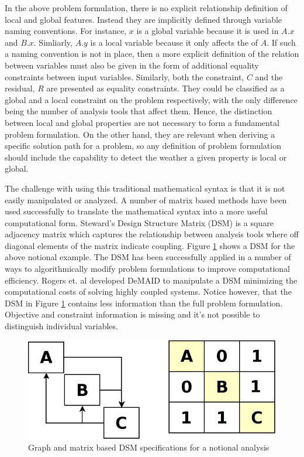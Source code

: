     In the above problem formulation, there is no explicit relationship definition of local and global features. Instead they are 
    implicitly defined through variable naming conventions. For instance, $x$ is a global variable because it is used in $A.x$ and $B.x$. 
    Simliarly, $A.y$ is a local variable because it only affects the of $A$. If such a naming convention is not in place, 
    then a more explicit definition of the relation between variables must also be given in the form of additional equality constraints between 
    input variables. Similarly, both the constraint, $C$ and the residual, $R$ are presented as equality constraints. They could be classified as 
    a global and a local constraint on the problem respectively, with the only difference being the number of analysis tools that affect them.  
    Hence, the distinction between local and global properties are not necessary to form a fundamental 
    problem formulation. On the other hand, they are relevant when deriving a specific solution path for a problem, so any definition of problem 
    formulation should include the capability to detect the weather a given property is local or global. 

    The challenge with using this traditional mathematical syntax is that it is not easily manipulated or analyzed. 
    A number of matrix based methods have been used successfully to translate the mathematical syntax into a more useful computational form. 
    Steward's Design Structure Matrix (DSM) is a square adjacency matrix which captures the relationship between analysis tools where off 
    diagonal elements of the matrix indicate coupling\cite{Steward1981}. Figure \ref{fig:dsm_simple} shows a DSM for the above notional example. 
    The DSM has been successfully applied in a number of ways to algorithmically modify problem formulations to 
    improve computational efficiency. Rogers et. al developed DeMAID to manipulate a
    DSM  minimizing the computational costs of solving highly coupled systems\cite{Rogers1996}. Notice however, that the DSM in 
    Figure \ref{fig:dsm_simple} contains less information than the full problem formulation. Objective and constraint information 
    is missing and it's not possible to distinguish individual variables.

    \begin{figure}[!hbp]
        \begin{center}
        \includegraphics[width=.75\textwidth]{images/dsm_simple}
        \caption{Graph and matrix based DSM specifications for a notional analysis \label{fig:dsm_simple}}
        \end{center}
    \end{figure}

